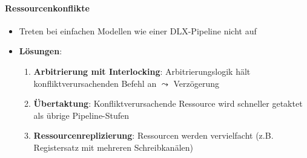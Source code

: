 \paragraph{Ressourcenkonflikte}
\begin{itemize}
  \item Treten bei einfachen Modellen wie einer DLX-Pipeline nicht auf
  \item \textbf{Lösungen}:
  \begin{enumerate}
    \item \textbf{Arbitrierung mit Interlocking}: Arbitrierungslogik hält konfliktverursachenden Befehl an \( \leadsto \) Verzögerung
    \item \textbf{Übertaktung}: Konfliktverursachende Ressource wird schneller getaktet als übrige Pipeline-Stufen
    \item \textbf{Ressourcenreplizierung}: Ressourcen werden vervielfacht (z.B. Registersatz mit mehreren Schreibkanälen) 
  \end{enumerate}
\end{itemize}

